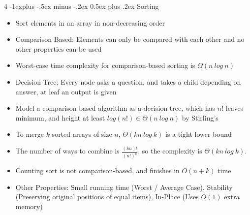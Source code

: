 \documentclass[10pt, landscape]{article}
\makeatletter
\renewcommand{\section}{\@startsection{section}{1}{0mm}%
                                {-1ex plus -.5ex minus -.2ex}%
                                {0.5ex plus .2ex}%
                                {\normalfont\large\bfseries}}
\renewcommand{\section}{\@startsection{section}{2}{0mm}%
                                {-1explus -.5ex minus -.2ex}%
                                {0.5ex plus .2ex}%
                                {\normalfont\normalsize\bfseries}}
\makeatother
\begin{document}
\begin{multicols*}{4}
\section{Sorting}
\begin{itemize}
    \item Sort elements in an array in non-decreasing order
    \item Comparison Based: Elements can only be compared with each other and no other properties can be used
    \item Worst-case time complexity for comparison-based sorting is $\Omega(n\ log\ n)$
    \item Decision Tree: Every node asks a question, and takes a child depending on answer, at leaf an output is given
    \item Model a comparison based algorithm as a decision tree, which has $n!$ leaves minimum, and height at least $log(n!)\in \Theta(n\ log \ n)$ by Stirling's
    \item To merge $k$ sorted arrays of size $n$, $\Theta(kn\ log\ k)$ is a tight lower bound
    \item The number of ways to combine is $\frac{(kn)!}{(n!)^k}$, so the complexity is $\Theta(kn\ log\ k)$.
    \item Counting sort is not comparison-based, and finishes in $O(n+k)$ time
    \item Other Properties: Small running time (Worst / Average Case), Stability (Preserving original positions of equal items), In-Place (Uses $O(1)$ extra memory) 
\end{itemize}


\end{multicols*}
\end{document}
